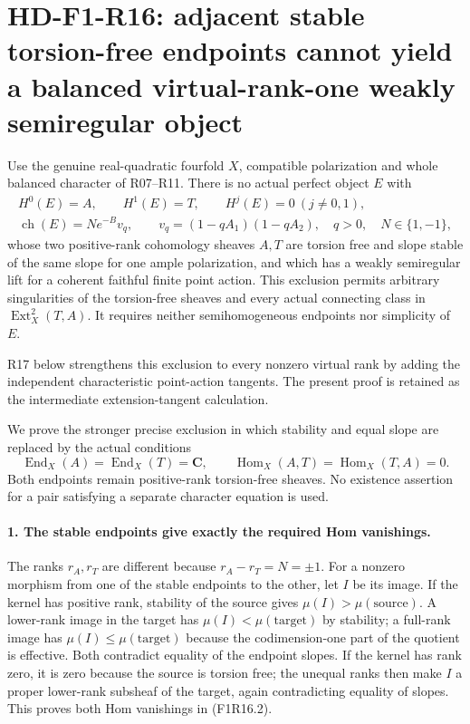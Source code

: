 \section[HD-F1-R16: adjacent stable endpoints in virtual rank one]{HD-F1-R16: adjacent stable torsion-free endpoints cannot yield a balanced virtual-rank-one weakly semiregular object}
\label{sec:followup-rm-stable-adjacent}

Use the genuine real-quadratic fourfold $X$, compatible
polarization and whole balanced character of R07--R11. There
is no actual perfect object $E$ with
\[
 \begin{gathered}
 H^0(E)=A,\qquad H^1(E)=T,\qquad H^j(E)=0\ (j\ne0,1),\\
 \operatorname{ch}(E)=N e^{-B}v_q,\qquad
 v_q=(1-qA_1)(1-qA_2),\quad q>0,\quad N\in\{1,-1\},
 \end{gathered}
 \tag{F1R16.1}
\]
whose two positive-rank cohomology sheaves $A,T$ are
torsion free and slope stable of the same slope for one
ample polarization, and which has a weakly semiregular
lift for a coherent faithful finite point action. This
exclusion permits arbitrary singularities of the
torsion-free sheaves and every actual connecting class
in $\operatorname{Ext}^2_X(T,A)$. It requires neither
semihomogeneous endpoints nor simplicity of $E$.

R17 below strengthens this exclusion to every nonzero
virtual rank by adding the independent characteristic
point-action tangents. The present proof is retained
as the intermediate extension-tangent calculation.

We prove the stronger precise exclusion in which stability
and equal slope are replaced by the actual conditions
\[
 \operatorname{End}_X(A)=\operatorname{End}_X(T)=\mathbf C,
 \qquad
 \operatorname{Hom}_X(A,T)=\operatorname{Hom}_X(T,A)=0.
 \tag{F1R16.2}
\]
Both endpoints remain positive-rank torsion-free sheaves.
No existence assertion for a pair satisfying a separate
character equation is used.

\paragraph{1. The stable endpoints give exactly the required Hom vanishings.}
The ranks $r_A,r_T$ are different because
$r_A-r_T=N=\pm1$. For a nonzero morphism from one of
the stable endpoints to the other, let $I$ be its image.
If the kernel has positive rank, stability of the source
gives $\mu(I)>\mu(\text{source})$. A lower-rank image in
the target has $\mu(I)<\mu(\text{target})$ by stability;
a full-rank image has $\mu(I)\le\mu(\text{target})$
because the codimension-one part of the quotient is
effective. Both contradict equality of the endpoint
slopes. If the kernel has rank zero, it is zero because
the source is torsion free; the unequal ranks then make
$I$ a proper lower-rank subsheaf of the target, again
contradicting equality of slopes. This proves both Hom
vanishings in (F1R16.2).

